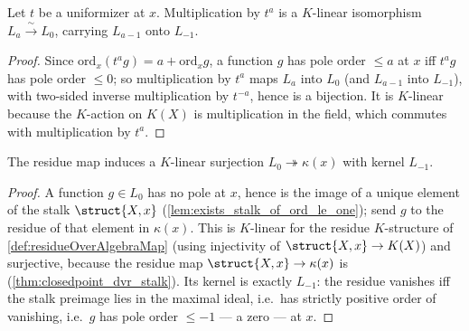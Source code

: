 \begin{theorem}
  \label{thm:shiftMap}
  \leanok
  Let \(t\) be a uniformizer at \(x\). Multiplication by \(t^a\) is a \(K\)-linear isomorphism
  \(L_a \xrightarrow{\ \sim\ } L_0\), carrying \(L_{a-1}\) onto \(L_{-1}\).
\end{theorem}
\begin{proof}
  \leanok
  Since \(\mathrm{ord}_x(t^a g) = a + \mathrm{ord}_x g\), a function \(g\) has pole order \(\le a\)
  at \(x\) iff \(t^a g\) has pole order \(\le 0\); so multiplication by \(t^a\) maps \(L_a\) into
  \(L_0\) (and \(L_{a-1}\) into \(L_{-1}\)), with two-sided inverse multiplication by \(t^{-a}\),
  hence is a bijection. It is \(K\)-linear because the \(K\)-action on \(K(X)\) is multiplication in
  the field, which commutes with multiplication by \(t^a\).
\end{proof}

\begin{theorem}
  \label{thm:baseHom}
  \leanok
  The residue map induces a \(K\)-linear surjection \(L_0 \twoheadrightarrow \kappa(x)\) with kernel
  \(L_{-1}\).
\end{theorem}
\begin{proof}
  \leanok
  A function \(g \in L_0\) has no pole at \(x\), hence is the image of a unique element of the stalk
  \(\struct{X,x}\) (\ref{lem:exists_stalk_of_ord_le_one}); send \(g\) to the residue of that element
  in \(\kappa(x)\). This is \(K\)-linear for the residue \(K\)-structure of
  \ref{def:residueOverAlgebraMap} (using injectivity of \(\struct{X,x} \to K(X)\)) and surjective,
  because the residue map \(\struct{X,x} \to \kappa(x)\) is (\ref{thm:closedpoint_dvr_stalk}). Its
  kernel is exactly \(L_{-1}\): the residue vanishes iff the stalk preimage lies in the maximal
  ideal, i.e.\ has strictly positive order of vanishing, i.e.\ \(g\) has pole order \(\le -1\) --- a
  zero --- at \(x\).
\end{proof}

